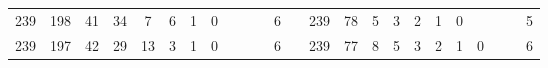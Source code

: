 {\begin{tabular}{cccccccccccclccccccccccc}
239                                                & 198                                                & 41                                               & 34                                               & 7                                                & 6                                                & 1                                               & 0                                               &                                                 &                                                 &                                                 & 6                                                &                          & 239                                                & 78                                                 & 5                                                & 3                                                & 2                                               & 1                                               & 0                                               &                                                 &                                                 &                                                 & 5                                                \\
239                                                & 197                                                & 42                                               & 29                                               & 13                                               & 3                                                & 1                                               & 0                                               &                                                 &                                                 &                                                 & 6                                                &                          & 239                                                & 77                                                 & 8                                                & 5                                                & 3                                               & 2                                               & 1                                               & 0                                               &                                                 &                                                 & 6                                                \\

\end{tabular}}

